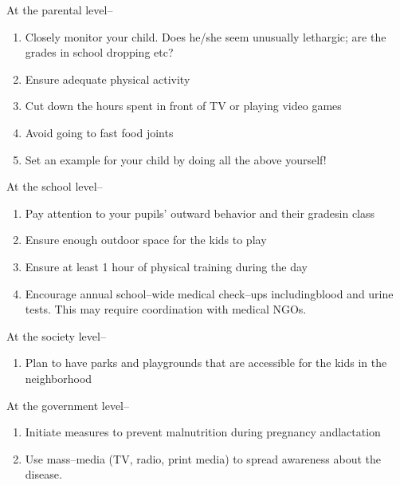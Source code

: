 \noindent
At the parental level–

\vspace{-\topsep}
\begin{enumerate}[•]
\itemsep=0pt
\item Closely monitor your child. Does he/she seem unusually lethargic; are the grades in school dropping etc?
\item Ensure adequate physical activity
\item Cut down the hours spent in front of TV or playing video games
\item Avoid going to fast food joints
\item Set an example for your child by doing all the above yourself!
\end{enumerate}
\vspace{-\topsep}

\noindent
At the school level–

\vspace{-\topsep}
\begin{enumerate}[•]
\itemsep=0pt
\item Pay attention to your pupils’ outward behavior and their grades\break in class
\item Ensure enough outdoor space for the kids to play
\item Ensure at least 1 hour of physical training during the day
\item Encourage annual school–wide medical check–ups including\break blood and urine tests. This may require coordination with medical NGOs.
\end{enumerate}
\vspace{-\topsep}

\noindent
At the society level–

\vspace{-\topsep}
\begin{enumerate}[•]
\itemsep=0pt
\item Plan to have parks and playgrounds that are accessible for the kids in the neighborhood
 \end{enumerate}
 \vspace{-\topsep}

\clearpage

\noindent At the government level–

\vspace{-\topsep}
\begin{enumerate}[•]
\itemsep=0pt
\item Initiate measures to prevent malnutrition during pregnancy and\break lactation
 \item Use mass–media (TV, radio, print media) to spread awareness about the disease.
 \end{enumerate}
 \vspace{-\topsep}


